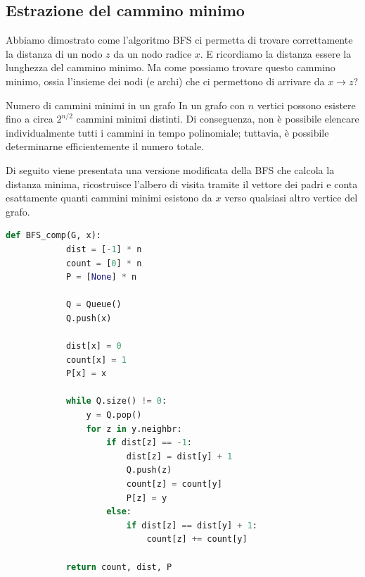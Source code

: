 \documentclass[12pt]{report}
\begin{document}
	\subsection{Estrazione del cammino minimo}
	
	Abbiamo dimostrato come l'algoritmo BFS ci permetta di trovare correttamente la distanza di un nodo $z$ da un nodo radice $x$. E ricordiamo la distanza essere la lunghezza del cammino minimo. Ma come possiamo trovare questo cammino minimo, ossia l'insieme dei nodi (e archi) che ci permettono di arrivare da $x \rightarrow z$?
	
	\begin{osservazione}{Numero di cammini minimi in un grafo}{}
		In un grafo con $n$ vertici possono esistere fino a circa $2^{n/2}$ cammini minimi distinti. Di conseguenza, non è possibile elencare individualmente tutti i cammini in tempo polinomiale; tuttavia, è possibile determinarne efficientemente il numero totale.
	\end{osservazione}
	
	Di seguito viene presentata una versione modificata della BFS che calcola la distanza minima, ricostruisce l'albero di visita tramite il vettore dei padri e conta esattamente quanti cammini minimi esistono da $x$ verso qualsiasi altro vertice del grafo.
	
	\begin{lstlisting}[style=stile-listings, language=Python, caption={Algoritmo BFS per il conteggio dei cammini minimi}]
		def BFS_comp(G, x):
			dist = [-1] * n
			count = [0] * n
			P = [None] * n
			
			Q = Queue()
			Q.push(x)
			
			dist[x] = 0
			count[x] = 1
			P[x] = x
			
			while Q.size() != 0:
				y = Q.pop()
				for z in y.neighbr:
					if dist[z] == -1:
						dist[z] = dist[y] + 1
						Q.push(z)
						count[z] = count[y]
						P[z] = y
					else:
						if dist[z] == dist[y] + 1:
							count[z] += count[y]
			
			return count, dist, P
	\end{lstlisting}
	
\end{document}

